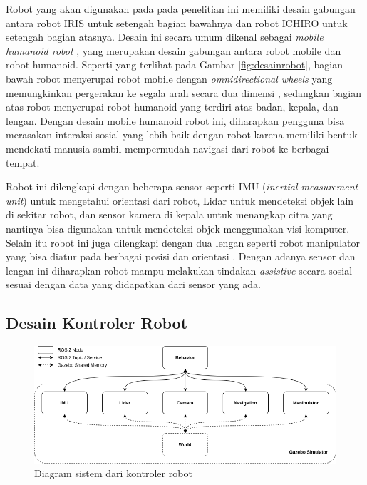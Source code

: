 Robot yang akan digunakan pada pada penelitian ini memiliki desain gabungan antara robot IRIS \citep{dikairono2020} untuk setengah bagian bawahnya dan robot ICHIRO \citep{muhtadin2019} untuk setengah bagian atasnya.
Desain ini secara umum dikenal sebagai \emph{mobile humanoid robot} \citep{mohamed2012}, yang merupakan desain gabungan antara robot mobile dan robot humanoid.
Seperti yang terlihat pada Gambar \ref{fig:desainrobot}, bagian bawah robot menyerupai robot mobile dengan \emph{omnidirectional wheels} yang memungkinkan pergerakan ke segala arah secara dua dimensi \citep{oliveira2008}, sedangkan bagian atas robot menyerupai robot humanoid yang terdiri atas badan, kepala, dan lengan.
Dengan desain mobile humanoid robot ini, diharapkan pengguna bisa merasakan interaksi sosial yang lebih baik dengan robot karena memiliki bentuk mendekati manusia \citep{rossi2018} sambil mempermudah navigasi dari robot ke berbagai tempat.

Robot ini dilengkapi dengan beberapa sensor seperti IMU (\emph{inertial measurement unit}) untuk mengetahui orientasi dari robot, Lidar untuk mendeteksi objek lain di sekitar robot, dan sensor kamera di kepala untuk menangkap citra yang nantinya bisa digunakan untuk mendeteksi objek menggunakan visi komputer.
Selain itu robot ini juga dilengkapi dengan dua lengan seperti robot manipulator yang bisa diatur pada berbagai posisi dan orientasi \citep{iqbal2012}.
Dengan adanya sensor dan lengan ini diharapkan robot mampu melakukan tindakan \emph{assistive} secara sosial sesuai dengan data yang didapatkan dari sensor yang ada.

\subsection{Desain Kontroler Robot}

\begin{figure} [ht]
  \centering
  \includegraphics[scale=0.5]{gambar/kontrolerrobot.png}
  \caption{Diagram sistem dari kontroler robot}
  \label{fig:kontrolerrobot}
\end{figure}

